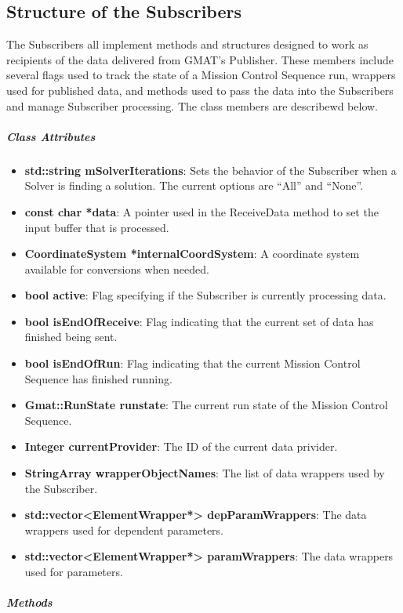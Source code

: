 \subsection{Structure of the Subscribers}

The Subscribers all implement methods and structures designed to work as recipients of the data
delivered from GMAT's Publisher.  These members include several flags used to track the state of a
Mission Control Sequence run, wrappers used for published data, and methods used to pass the data
into the Subscribers and manage Subscriber processing.  The class members are describewd below.

\subparagraph{\textit{Class Attributes}}

\begin{itemize}
\item \textbf{std::string mSolverIterations}: Sets the behavior of the Subscriber when a Solver is
finding a solution.  The current options are ``All'' and ``None''.
\item \textbf{const char *data}: A pointer used in the ReceiveData method to set the input buffer
that is processed.
\item \textbf{CoordinateSystem *internalCoordSystem}: A coordinate system available for conversions
when needed.
\item \textbf{bool active}: Flag specifying if the Subscriber is currently processing data.
\item \textbf{bool isEndOfReceive}: Flag indicating that the current set of data has finished being
sent.
\item \textbf{bool isEndOfRun}: Flag indicating that the current Mission Control Sequence has
finished running.
\item \textbf{Gmat::RunState runstate}: The current run state of the Mission Control Sequence.
\item \textbf{Integer currentProvider}: The ID of the current data privider.
\item \textbf{StringArray wrapperObjectNames}: The list of data wrappers used by the Subscriber.
\item \textbf{std::vector<ElementWrapper*> depParamWrappers}: The data wrappers used for dependent
parameters.
\item \textbf{std::vector<ElementWrapper*> paramWrappers}: The data wrappers used for parameters.
\end{itemize}

\subparagraph{\textit{Methods}}

